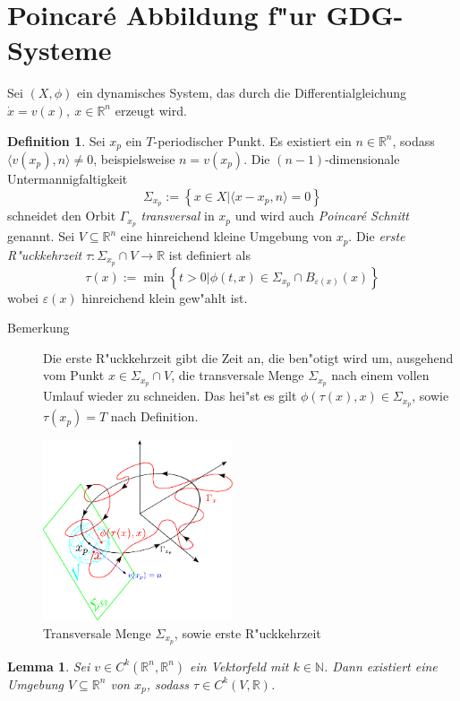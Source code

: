 \documentclass[a4paper, 13pt]{scrreprt}
\newtheorem{lemma}[theorem]{Lemma}
\theoremstyle{definition} \newtheorem{definition}{Definition}[section]
\newcommand{\RR}{\mathbb{R}}
\begin{document}
\section{Poincar\'{e}  Abbildung f"ur GDG-Systeme}
Sei $(X,\phi)$ ein dynamisches System, das durch die Differentialgleichung $\dot x = v(x), \ x \in \RR^n$ erzeugt wird.
\begin{definition}
Sei $x_p$ ein $T$-periodischer Punkt. Es existiert ein $n\in\RR^n$, sodass $\langle v(x_p), n \rangle \neq 0$, beispielsweise $n = v(x_p)$. Die $(n-1)$-dimensionale Untermannigfaltigkeit
$$\Sigma_{x_p} := \left \{ \left. x \in X \right| \langle x - x_p, n \rangle =0 \right \}$$ 
schneidet den Orbit $\Gamma_{x_p}$ \emph{transversal} in $x_p$ und wird auch \emph{Poincar\'{e} Schnitt} genannt. Sei $V\subseteq \RR^n$ eine hinreichend kleine Umgebung von $x_p$. Die \emph{erste R"uckkehrzeit} $\tau\colon \Sigma_{x_p} \cap V \to \RR$ ist definiert als
$$\tau(x) := \min \left \{ \left. t> 0 \right| \phi(t, x) \in \Sigma_{x_p} \cap B_{\varepsilon(x)}(x) \right \}$$
wobei $\varepsilon(x)$ hinreichend klein gew"ahlt ist.
\end{definition}
\begin{description}
\item[Bemerkung] 
Die erste R"uckkehrzeit gibt die Zeit an, die ben"otigt wird um, ausgehend vom Punkt $x \in \Sigma_{x_p}\cap V$, die transversale Menge $\Sigma_{x_p}$ nach einem vollen Umlauf wieder zu schneiden. Das hei"st es gilt $\phi(\tau(x), x) \in \Sigma_{x_p}$, sowie $\tau(x_p) = T$ nach Definition.
\end{description}
\begin{figure}[htpb]
		\centering
		\includegraphics[width=0.5\textwidth]{img/periodische_orbits/transversal_rueckkehrzeit.pdf}
		\caption{Transversale Menge $\Sigma_{x_p}$, sowie erste R"uckkehrzeit}
\end{figure}
\begin{lemma}\label{rueckkehrzeit_diffbar}
Sei $v \in C^k(\RR^n,\RR^n)$ ein Vektorfeld mit $k \in \mathbb{N}$. Dann existiert eine Umgebung $V\subseteq \RR^n$ von $x_p$, sodass $\tau \in C^k(V, \RR)$.
\end{lemma}
\end{document}
